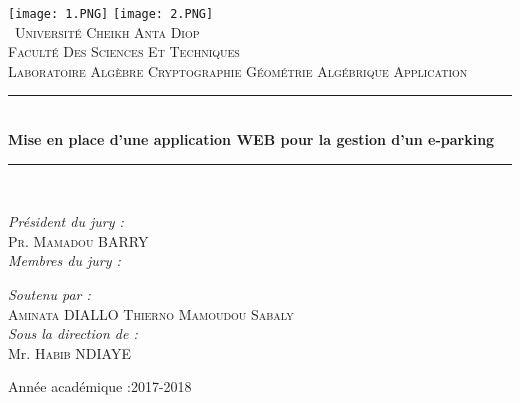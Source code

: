 \documentclass[12pt, openany]{report}
\newcommand{\HRule}{\rule{\linewidth}{0.5mm}}
\begin{document}
\begin{titlepage}
  \begin{sffamily}
 \begin{center}

     \texttt{[image: 1.PNG]} \hspace{8.5cm}
     \texttt{[image: 2.PNG]} \\

        \textsc{\ Université Cheikh Anta Diop \\Faculté Des Sciences Et Techniques\\Laboratoire Algèbre Cryptographie Géométrie Algébrique Application}\\[1.5cm]





      \HRule \\[0.4cm]
          { \huge \bfseries Mise en place d'une application WEB pour la gestion d'un e-parking\\[0.4cm] }
       \HRule \\[0.2cm]


    \begin{minipage}{0.4\textwidth}
      \begin{flushleft} \large
        \emph{Président du jury :}
               \\ \textsc{Pr. Mamadou BARRY}\\
      \emph{Membres du jury :}
     

      \end{flushleft}
       \hspace{10.5cm}
    \end{minipage}
    \begin{minipage}{0.4\textwidth}
      \begin{flushright} \large
       \emph{Soutenu par :}
         \\ \textsc{Aminata DIALLO
         \newline
         Thierno Mamoudou Sabaly 
              }\\
   \emph{Sous la direction de :}
   \\ Mr. \textsc{Habib NDIAYE}\\



      \end{flushright}
    \end{minipage}

    \vfill

    {\large {}Année académique :2017-2018}

  \end{center}
  \end{sffamily}
\end{titlepage}
\newpage
   \thispagestyle{empty}
   \newpage
\end{document}
